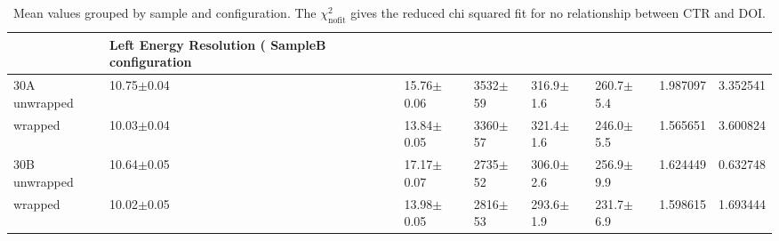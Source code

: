 \begin{table}
\caption{\label{tab:doiresults} Mean values grouped by sample and configuration. The $\chi^2_\text{nofit}$ gives the reduced chi squared fit for no relationship between CTR and DOI.}
\begin{tabular}{llllllrr}
\hline
& Left Energy Resolution (%
SampleB configuration &                      &                  &              &                &                &             &                        \\
\hline
30A     unwrapped     &       10.75$\pm$0.04 &   15.76$\pm$0.06 &  3532$\pm$59 &  316.9$\pm$1.6 &  260.7$\pm$5.4 &    1.987097 &               3.352541 \\
        wrapped       &       10.03$\pm$0.04 &   13.84$\pm$0.05 &  3360$\pm$57 &  321.4$\pm$1.6 &  246.0$\pm$5.5 &    1.565651 &               3.600824 \\
30B     unwrapped     &       10.64$\pm$0.05 &   17.17$\pm$0.07 &  2735$\pm$52 &  306.0$\pm$2.6 &  256.9$\pm$9.9 &    1.624449 &               0.632748 \\
        wrapped       &       10.02$\pm$0.05 &   13.98$\pm$0.05 &  2816$\pm$53 &  293.6$\pm$1.9 &  231.7$\pm$6.9 &    1.598615 &               1.693444 \\
\hline
\end{tabular}
\end{table}

